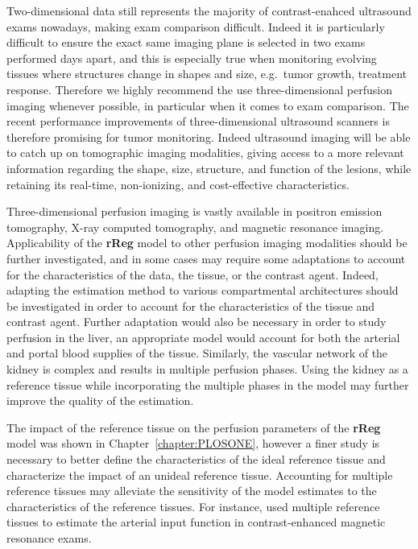 Two-dimensional data still represents the majority of contrast-enahced ultrasound exams nowadays, making exam comparison difficult.
Indeed it is particularly difficult to ensure the exact same imaging plane is selected in two exams performed days apart, and this is especially true when monitoring evolving tissues where structures change in shapes and size, e.g.~tumor growth, treatment response.
Therefore we highly recommend the use three-dimensional perfusion imaging whenever possible, in particular when it comes to exam comparison.
The recent performance improvements of three-dimensional ultrasound scanners is therefore promising for tumor monitoring.
Indeed ultrasound imaging will be able to catch up on tomographic imaging modalities, giving access to a more relevant information regarding the shape, size, structure, and function of the lesions, while retaining its real-time, non-ionizing, and cost-effective characteristics.

Three-dimensional perfusion imaging is vastly available in positron emission tomography, X-ray computed tomography, and magnetic resonance imaging.
Applicability of the \textbf{rReg} model to other perfusion imaging modalities should be further investigated, and in some cases may require some adaptations to account for the characteristics of the data, the tissue, or the contrast agent.
Indeed, adapting the estimation method to various compartmental architectures should be investigated in order to account for the characteristics of the tissue and contrast agent.
Further adaptation would also be necessary in order to study perfusion in the liver, an appropriate model would account for both the arterial and portal blood supplies of the tissue.
Similarly, the vascular network of the kidney is complex and results in multiple perfusion phases.
Using the kidney as a reference tissue while incorporating the multiple phases in the model may further improve the quality of the estimation.

The impact of the reference tissue on the perfusion parameters of the \textbf{rReg} model was shown in Chapter~\ref{chapter:PLOSONE}, however a finer study is necessary to better define the characteristics of the ideal reference tissue and characterize the impact of an unideal reference tissue. 
Accounting for multiple reference tissues may alleviate the sensitivity of the model estimates to the characteristics of the reference tissues. 
For instance, \citet{Yang:2007ki} used multiple reference tissues to estimate the arterial input function in contrast-enhanced magnetic resonance exams.

